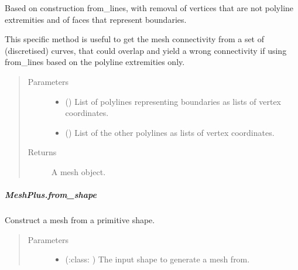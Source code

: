 \documentclass[letterpaper,10pt,english]{sphinxmanual}
\begin{document}
\begin{fulllineitems}
\begin{fulllineitems}
Based on construction from\_lines,
with removal of vertices that are not polyline extremities
and of faces that represent boundaries.

This specific method is useful to get the mesh connectivity from a set of (discretised) curves,
that could overlap and yield a wrong connectivity if using from\_lines based on the polyline extremities only.
\begin{quote}\begin{description}
\item[{Parameters}] \leavevmode\begin{itemize}
\item {} 
 () \textendash{} List of polylines representing boundaries as lists of vertex coordinates.

\item {} 
 () \textendash{} List of the other polylines as lists of vertex coordinates.

\end{itemize}

\item[{Returns}] \leavevmode
{} \textendash{} A mesh object.

\end{description}\end{quote}

\end{fulllineitems}



\subparagraph{MeshPlus.from\_shape}
\label{\detokenize{api/generated/directional_clustering.mesh.MeshPlus.from_shape:meshplus-from-shape}}\label{\detokenize{api/generated/directional_clustering.mesh.MeshPlus.from_shape::doc}}

\begin{fulllineitems}
\label{\detokenize{api/generated/directional_clustering.mesh.MeshPlus.from_shape:directional_clustering.mesh.MeshPlus.from_shape}}
Construct a mesh from a primitive shape.
\begin{quote}\begin{description}
\item[{Parameters}] \leavevmode\begin{itemize}
\item {} 
 (:class: ) \textendash{} The input shape to generate a mesh from.


\end{itemize}
\end{description}
\end{quote}
\end{fulllineitems}
\end{fulllineitems}
\end{document}
